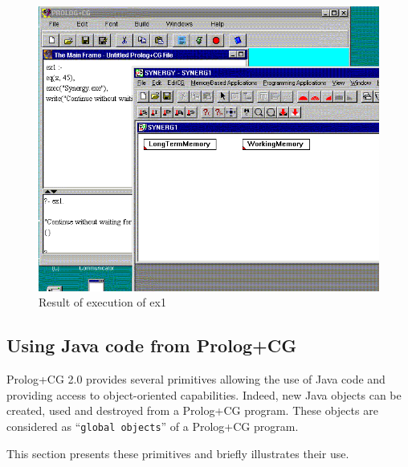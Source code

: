 \documentclass{book}
\begin{document}
\begin{htmlonly}

\begin{figure}
\begin{center}
\includegraphics{ppcgsyn.png}
\end{center}
\caption{\label{Fig:ppcgsyn}Result of execution of ex1}
\end{figure}

\end{htmlonly}




\subsection{Using Java code from Prolog+CG}

Prolog+CG 2.0 provides several primitives allowing the use of Java
code and providing access to object-oriented capabilities. Indeed, new
Java objects can be created, used and destroyed from a Prolog+CG
program. These objects are considered as ``\texttt{global objects}'' of a
Prolog+CG program.

This section presents these primitives and briefly illustrates their
use.
\end{document}
